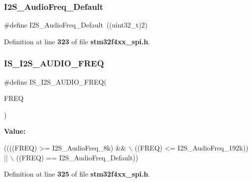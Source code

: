 \subsubsection{I2\+S\+\_\+\+Audio\+Freq\+\_\+\+Default}
{\footnotesize\ttfamily \#define I2\+S\+\_\+\+Audio\+Freq\+\_\+\+Default~((uint32\+\_\+t)2)}



Definition at line \textbf{ 323} of file \textbf{ stm32f4xx\+\_\+spi.\+h}.

\mbox{\label{group__SPI__I2S__Audio__Frequency_gaf39d917f4a38fd9916ec347fb055391c}} 
\subsubsection{I\+S\+\_\+\+I2\+S\+\_\+\+A\+U\+D\+I\+O\+\_\+\+F\+R\+EQ}
{\footnotesize\ttfamily \#define I\+S\+\_\+\+I2\+S\+\_\+\+A\+U\+D\+I\+O\+\_\+\+F\+R\+EQ(\begin{DoxyParamCaption}\item[{}]{F\+R\+EQ }\end{DoxyParamCaption})}

{\bfseries Value\+:}
\begin{DoxyCode}
((((FREQ) >= I2S_AudioFreq_8k) && \(\backslash\)
                                 ((FREQ) <= I2S_AudioFreq_192k)) || \(\backslash\)
                                 ((FREQ) == I2S_AudioFreq_Default))
\end{DoxyCode}


Definition at line \textbf{ 325} of file \textbf{ stm32f4xx\+\_\+spi.\+h}.

